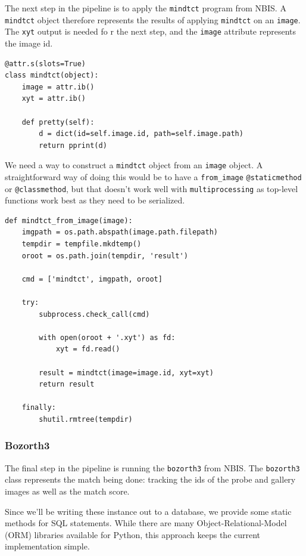 The next step in the pipeline is to apply the \texttt{mindtct} program
from NBIS. A \texttt{mindtct} object therefore represents the results of
applying \texttt{mindtct} on an \texttt{image}. The \texttt{xyt} output
is needed fo r the next step, and the \texttt{image} attribute
represents the image id.

\begin{lstlisting}
@attr.s(slots=True)
class mindtct(object):
    image = attr.ib()
    xyt = attr.ib()

    def pretty(self):
        d = dict(id=self.image.id, path=self.image.path)
        return pprint(d)
\end{lstlisting}

We need a way to construct a \texttt{mindtct} object from an
\texttt{image} object. A straightforward way of doing this would be to
have a \texttt{from\_image} \texttt{@staticmethod} or
\texttt{@classmethod}, but that doesn't work well with
\texttt{multiprocessing} as top-level functions work best as they need
to be serialized.

\begin{lstlisting}
def mindtct_from_image(image):
    imgpath = os.path.abspath(image.path.filepath)
    tempdir = tempfile.mkdtemp()
    oroot = os.path.join(tempdir, 'result')

    cmd = ['mindtct', imgpath, oroot]

    try:
        subprocess.check_call(cmd)

        with open(oroot + '.xyt') as fd:
            xyt = fd.read()

        result = mindtct(image=image.id, xyt=xyt)
        return result

    finally:
        shutil.rmtree(tempdir)
\end{lstlisting}

\subsubsection{Bozorth3}\label{bozorth3}

The final step in the pipeline is running the \texttt{bozorth3} from
NBIS. The \texttt{bozorth3} class represents the match being done:
tracking the ids of the probe and gallery images as well as the match
score.

Since we'll be writing these instance out to a database, we provide some
static methods for SQL statements. While there are many
Object-Relational-Model (ORM) libraries available for Python, this
approach keeps the current implementation simple.

